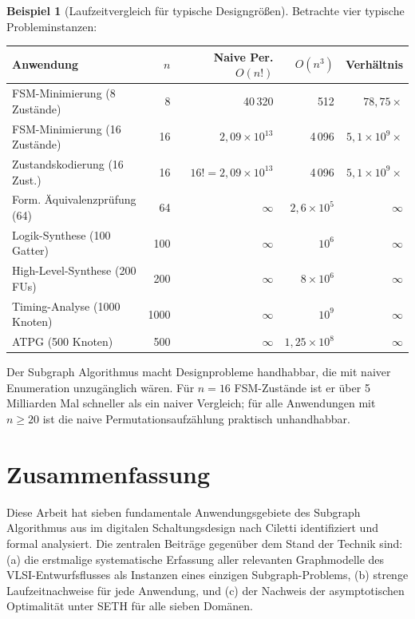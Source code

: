 ﻿\documentclass[a4paper,12pt]{article}
\theoremstyle{definition}
\newtheorem{beispiel}{Beispiel}
\begin{document}
\begin{beispiel}[Laufzeitvergleich für typische Designgrößen]
  Betrachte vier typische Probleminstanzen:

  \begin{center}
  \begin{tabular}{lrrrr}
    \toprule
    Anwendung & $n$ & Naive Per. $O(n!)$ & $O(n^3)$ & Verhältnis \\
    \midrule
    FSM-Minimierung (8 Zustände) & 8 & 40\,320 & 512 & $78{,}75\times$ \\
    FSM-Minimierung (16 Zustände) & 16 & $2{,}09 \times 10^{13}$ & 4\,096 & $5{,}1 \times 10^{9}\times$ \\
    Zustandskodierung (16 Zust.) & 16 & $16! = 2{,}09 \times 10^{13}$ & 4\,096 & $5{,}1 \times 10^{9}\times$ \\
    Form. Äquivalenzprüfung (64) & 64 & $\infty$ & $2{,}6 \times 10^5$ & $\infty$ \\
    Logik-Synthese (100 Gatter) & 100 & $\infty$ & $10^6$ & $\infty$ \\
    High-Level-Synthese (200 FUs) & 200 & $\infty$ & $8 \times 10^6$ & $\infty$ \\
    Timing-Analyse (1000 Knoten) & 1000 & $\infty$ & $10^9$ & $\infty$ \\
    ATPG (500 Knoten) & 500 & $\infty$ & $1{,}25 \times 10^8$ & $\infty$ \\
    \bottomrule
  \end{tabular}
  \end{center}

  Der Subgraph Algorithmus macht Designprobleme handhabbar, die mit naiver Enumeration
  unzugänglich wären. Für $n = 16$ FSM-Zustände ist er über 5 Milliarden Mal
  schneller als ein naiver Vergleich; für alle Anwendungen mit $n \geq 20$ ist die
  naive Permutationsaufzählung praktisch unhandhabbar.
\end{beispiel}

\section{Zusammenfassung}

Diese Arbeit hat sieben fundamentale Anwendungsgebiete des Subgraph Algorithmus aus
\cite{subgraph2026} im digitalen Schaltungsdesign nach Ciletti \cite{ciletti2011}
identifiziert und formal analysiert. Die zentralen Beiträge gegenüber dem Stand der
Technik sind: (a) die erstmalige systematische Erfassung aller relevanten
Graphmodelle des VLSI-Entwurfsflusses als Instanzen eines einzigen Subgraph-Problems,
(b) strenge Laufzeitnachweise für jede Anwendung, und (c) der Nachweis der
asymptotischen Optimalität unter SETH für alle sieben Domänen.
\end{document}
